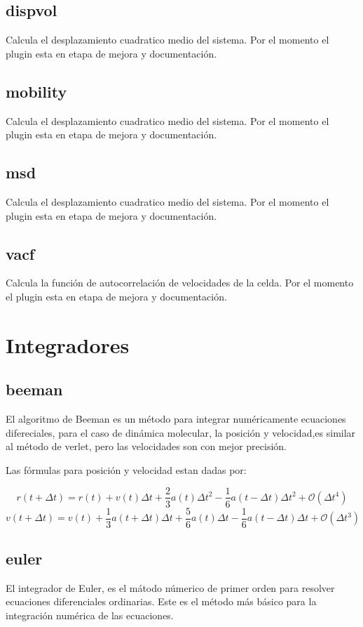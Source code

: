 \subsection{dispvol}
Calcula el desplazamiento cuadratico medio del sistema. Por el momento el plugin esta en etapa de mejora y documentaci\'on.
\subsection{mobility}
Calcula el desplazamiento cuadratico medio del sistema. Por el momento el plugin esta en etapa de mejora y documentaci\'on.
\subsection{msd}
Calcula el desplazamiento cuadratico medio del sistema. Por el momento el plugin esta en etapa de mejora y documentaci\'on.
\subsection{vacf}
Calcula la funci\'on de autocorrelaci\'on de velocidades de la celda. Por el momento el plugin esta en etapa de mejora y documentaci\'on.


\section{Integradores}
\subsection{beeman}
El algoritmo de Beeman es un m\'etodo para integrar num\'ericamente ecuaciones difereciales, para el caso de din\'amica molecular, la posici\'on y velocidad,es similar al m\'etodo de verlet, pero las velocidades son con mejor precisi\'on.

Las f\'ormulas para posici\'on y velocidad estan dadas por:

$$r(t+\Delta t) = r(t) + v(t)\Delta t + \frac{2}{3}a(t)\Delta t^2 - \frac{1}{6}a(t-\Delta t)\Delta t^2 +\mathcal{O}(\Delta t^4)$$
$$v(t+\Delta t) = v(t) + \frac{1}{3}a(t+\Delta t)\Delta t+\frac{5}{6}a(t)\Delta t-\frac{1}{6}a(t-\Delta t)\Delta t+\mathcal{O}(\Delta t^3)$$

\subsection{euler}
El integrador de Euler, es el m\'atodo n\'umerico de primer orden para resolver ecuaciones diferenciales ordinarias. Este es el m\'etodo m\'as b\'asico para la integraci\'on num\'erica de las ecuaciones.

